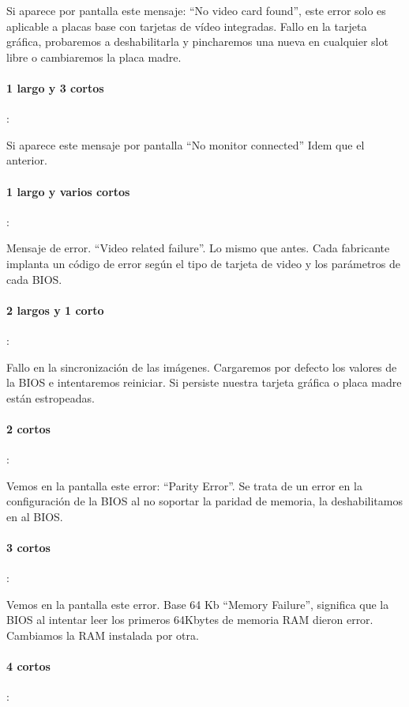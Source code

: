 \documentclass[12pt,oneside,a4paper]{article}
\begin{document}
			Si aparece por pantalla este mensaje: “No video card found”, este error
			solo es aplicable a placas base con tarjetas de vídeo integradas. Fallo
			en la tarjeta gráfica, probaremos a deshabilitarla y pincharemos una
			nueva en cualquier slot libre o cambiaremos la placa madre. 

			\paragraph{1 largo y 3 cortos}:

			Si aparece este mensaje por pantalla “No monitor connected” Idem que el
			anterior. 

			\paragraph{1 largo y varios cortos}: 

			Mensaje de error. “Video related failure”. Lo mismo que antes. Cada
			fabricante implanta un código de error según el tipo de tarjeta de
			video y los parámetros de cada BIOS.

			\paragraph{2 largos y 1 corto}:
			
			Fallo en la sincronización de las imágenes. Cargaremos por defecto los
			valores de la BIOS e intentaremos reiniciar. Si persiste nuestra
			tarjeta gráfica o placa madre están estropeadas. 

			\paragraph{2 cortos}:
			
			Vemos en la pantalla este error: “Parity Error”. Se trata de un error
			en la configuración de la BIOS al no soportar la paridad de memoria, la
			deshabilitamos en al BIOS. 

			\paragraph{3 cortos}:
			
			Vemos en la pantalla este error. Base 64 Kb “Memory Failure”, significa
			que la BIOS al intentar leer los primeros 64Kbytes de memoria RAM
			dieron error. Cambiamos la RAM instalada por otra. 

			\paragraph{4 cortos}:
			
\end{document}
